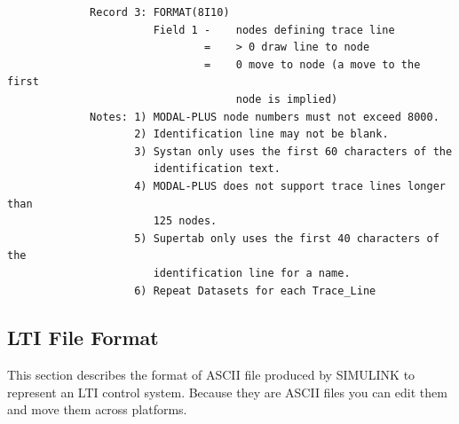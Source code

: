 \documentclass[11pt,openany,twoside]{book}
\numberwithin{equation}{section}		%
\begin{document}
\begin{verbatim}
             Record 3: FORMAT(8I10)
                       Field 1 -    nodes defining trace line
                               =    > 0 draw line to node
                               =    0 move to node (a move to the first
                                    node is implied)
             Notes: 1) MODAL-PLUS node numbers must not exceed 8000.
                    2) Identification line may not be blank.
                    3) Systan only uses the first 60 characters of the
                       identification text.
                    4) MODAL-PLUS does not support trace lines longer than
                       125 nodes.
                    5) Supertab only uses the first 40 characters of the
                       identification line for a name.
                    6) Repeat Datasets for each Trace_Line

\end{verbatim}

\subsection{LTI File Format}\label{sect:ABCD-file}
This section describes the format of ASCII file produced by SIMULINK
to represent an LTI control system.
Because they are ASCII files
you can edit them and move them across platforms.
\end{document}
